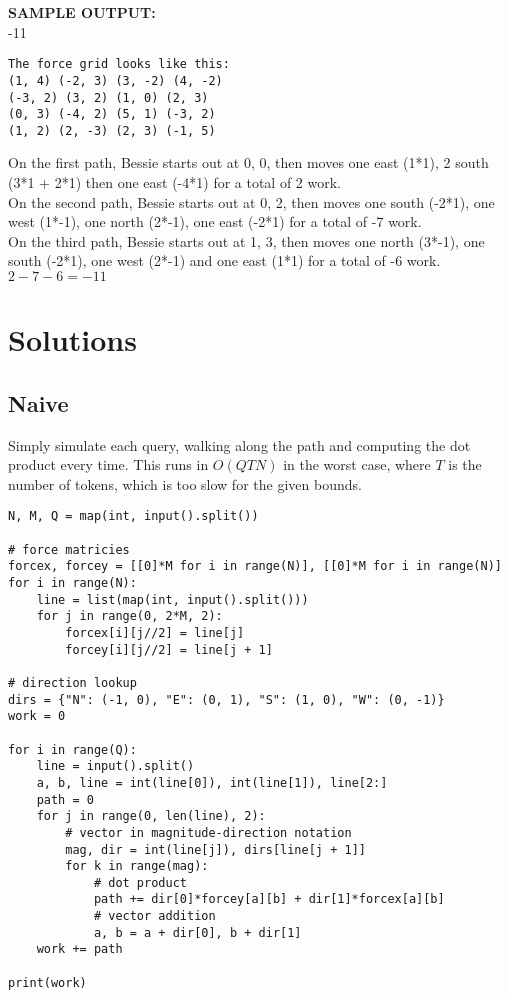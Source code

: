 \documentclass[11pt, oneside]{article}
\begin{document}
\noindent
\textbf{SAMPLE OUTPUT:} \\
-11

\newpage

\begin{verbatim}
The force grid looks like this:
(1, 4) (-2, 3) (3, -2) (4, -2)
(-3, 2) (3, 2) (1, 0) (2, 3)
(0, 3) (-4, 2) (5, 1) (-3, 2)
(1, 2) (2, -3) (2, 3) (-1, 5)\end{verbatim}

\noindent
On the first path, Bessie starts out at 0, 0, then moves one east (1*1),
2 south (3*1 + 2*1) then one east (-4*1) for a total of 2 work. \\

\noindent
On the second path, Bessie starts out at 0, 2,
then moves one south (-2*1),
one west (1*-1), one north (2*-1), one east (-2*1) for a total of -7 work. \\

\noindent
On the third path, Bessie starts out at 1, 3,
then moves one north (3*-1), one south (-2*1),
one west (2*-1) and one east (1*1) for a total of -6 work. \\

\( 2 - 7 - 6 = -11 \)

\newpage

\section{Solutions}
\subsection{Naive}

Simply simulate each query, walking along the path and computing the dot product every time.
This runs in \( O(QTN) \) in the worst case, where \( T \) is the number of tokens, which is too slow for the given bounds.

\begin{verbatim}
N, M, Q = map(int, input().split())

# force matricies
forcex, forcey = [[0]*M for i in range(N)], [[0]*M for i in range(N)]
for i in range(N):
    line = list(map(int, input().split()))
    for j in range(0, 2*M, 2):
        forcex[i][j//2] = line[j]
        forcey[i][j//2] = line[j + 1]

# direction lookup
dirs = {"N": (-1, 0), "E": (0, 1), "S": (1, 0), "W": (0, -1)}
work = 0

for i in range(Q):
    line = input().split()
    a, b, line = int(line[0]), int(line[1]), line[2:]
    path = 0
    for j in range(0, len(line), 2):
        # vector in magnitude-direction notation
        mag, dir = int(line[j]), dirs[line[j + 1]]
        for k in range(mag):
            # dot product
            path += dir[0]*forcey[a][b] + dir[1]*forcex[a][b]
            # vector addition
            a, b = a + dir[0], b + dir[1]
    work += path

print(work)
\end{verbatim}
\end{document}
